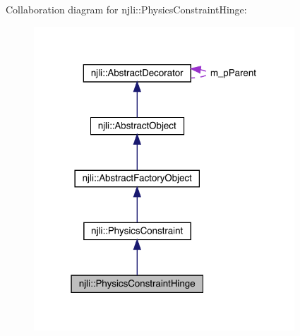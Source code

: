 Collaboration diagram for njli\+:\+:Physics\+Constraint\+Hinge\+:\nopagebreak
\begin{figure}[H]
\begin{center}
\leavevmode
\includegraphics[width=277pt]{classnjli_1_1_physics_constraint_hinge__coll__graph}
\end{center}
\end{figure}
